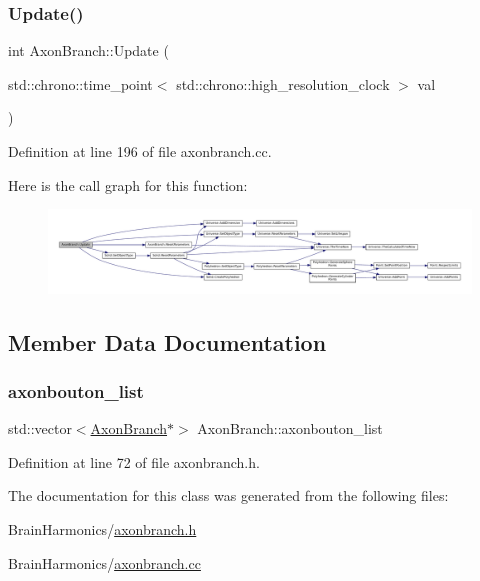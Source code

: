 \subsubsection{\texorpdfstring{Update()}{Update()}}
{\footnotesize\ttfamily int Axon\+Branch\+::\+Update (\begin{DoxyParamCaption}\item[{std\+::chrono\+::time\+\_\+point$<$ std\+::chrono\+::high\+\_\+resolution\+\_\+clock $>$}]{val }\end{DoxyParamCaption})}



Definition at line 196 of file axonbranch.\+cc.

Here is the call graph for this function\+:\nopagebreak
\begin{figure}[H]
\begin{center}
\leavevmode
\includegraphics[width=350pt]{class_axon_branch_a5a80bcccdc2be9f77fca25131937b52f_cgraph}
\end{center}
\end{figure}


\subsection{Member Data Documentation}
\mbox{\label{class_axon_branch_a43224f9fcb62274709438c9833cb10e5}} 
\subsubsection{\texorpdfstring{axonbouton\+\_\+list}{axonbouton\_list}}
{\footnotesize\ttfamily std\+::vector$<$\mbox{\hyperlink{class_axon_branch}{Axon\+Branch}}$\ast$$>$ Axon\+Branch\+::axonbouton\+\_\+list\hspace{0.3cm}{\ttfamily [protected]}}



Definition at line 72 of file axonbranch.\+h.



The documentation for this class was generated from the following files\+:\begin{DoxyCompactItemize}
\item 
Brain\+Harmonics/\mbox{\hyperlink{axonbranch_8h}{axonbranch.\+h}}\item 
Brain\+Harmonics/\mbox{\hyperlink{axonbranch_8cc}{axonbranch.\+cc}}\end{DoxyCompactItemize}
